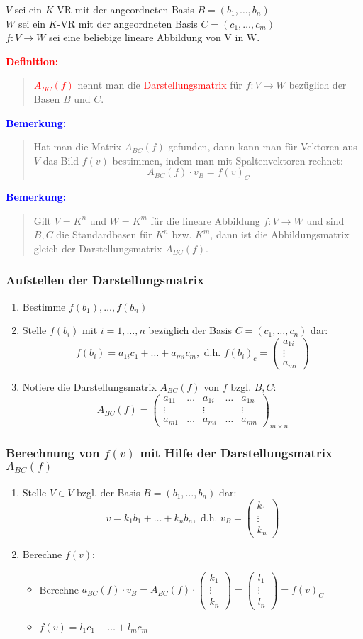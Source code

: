 \documentclass{article}
\newcommand{\red}[1]{\textcolor{red}{#1}}
\newcommand{\blue}[1]{\textcolor{blue}{#1}}
\newcommand{\de}[1]{\red{\textbf{Definition: }}\begin{quote}#1\end{quote}}
\newcommand{\an}[1]{\blue{\textbf{Bemerkung: }}\begin{quote}#1\end{quote}}
\newcommand{\vvvec}[3]{\begin{pmatrix}#1\\#2\\#3\end{pmatrix}}
\begin{document}
$V$ sei ein $K$-VR mit der angeordneten Basis $B = (b_1, \dots, b_n)$\\
$W$ sei ein $K$-VR mit der angeordneten Basis $C = (c_1, \dots, c_m)$\\
$f: V \to W$ sei eine beliebige lineare Abbildung von V in W.

\de{
    \red{$A_{BC}(f)$} nennt man die \red{Darstellungsmatrix} für $f: V \to W$ bezüglich der Basen $B$ und $C$.
}

\an{
    Hat man die Matrix $A_{BC}(f)$ gefunden, dann kann man für Vektoren aus $V$ das Bild $f(v)$ bestimmen, indem man mit Spaltenvektoren rechnet:
    $$A_{BC}(f) \cdot v_B =f(v)_C$$
}

\an{
    Gilt $V = K^n$ und $W = K^m$ für die lineare Abbildung $f: V \to W$ und sind $B,C$ die Standardbasen für $K^n$ bzw. $K^m$, dann ist die Abbildungsmatrix gleich der Darstellungsmatrix $A_{BC}(f)$.
}

\subsubsection*{Aufstellen der Darstellungsmatrix}

\begin{enumerate}
    \item Bestimme $f(b_1) , \dots, f(b_n)$
    \item Stelle $f(b_i)$ mit $i = 1, \dots, n$ bezüglich der Basis $C = (c_1, \dots, c_n)$ dar:
    $$f(b_i) = a_{1i}c_1 + \dots + a_{mi}c_m, \text{ d.h. } f(b_i)_c = \vvvec{a_{1i}}{\vdots}{a_{mi}}$$
    \item Notiere die Darstellungsmatrix $A_{BC}(f)$ von $f$ bzgl. $B,C$:
    $$A_{BC}(f) = \begin{pmatrix}
        a_{11} & \dots & a_{1i} & \dots & a_{1n}\\
        \vdots &  & \vdots &  & \vdots\\
        a_{m1} & \dots & a_{mi} & \dots & a_{mn}
    \end{pmatrix}_{m \times n}$$
\end{enumerate}

\subsubsection*{Berechnung von $f(v)$ mit Hilfe der Darstellungsmatrix $A_{BC}(f)$}

\begin{enumerate}
    \item Stelle $V \in V$ bzgl. der Basis $B = (b_1, \dots, b_n)$ dar:
    $$v = k_1b_1 + \dots + k_nb_n, \text{ d.h. } v_B = \vvvec{k_1}{\vdots}{k_n}$$
    \item Berechne $f(v)$:
    \begin{itemize}
        \item Berechne $a_{BC}(f) \cdot v_B = A_{BC}(f) \cdot \vvvec{k_1}{\vdots}{k_n} = \vvvec{l_1}{\vdots}{l_n} = f(v)_C$
        \item $f(v) = l_1c_1 + \dots + l_mc_m$
    \end{itemize}
\end{enumerate}
\end{document}
